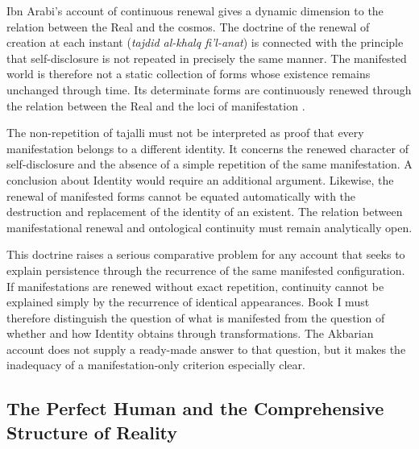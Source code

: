 \label{para:VS.B01.P01.C08.S16.SS12.P001}

Ibn Arabi's account of continuous renewal gives
a dynamic dimension to the relation between the
Real and the cosmos. The doctrine of the renewal
of creation at each instant
(\textit{tajdid al-khalq fi'l-anat}) is connected
with the principle that self-disclosure is not
repeated in precisely the same manner. The
manifested world is therefore not a static
collection of forms whose existence remains
unchanged through time. Its determinate forms
are continuously renewed through the relation
between the Real and the loci of manifestation
\citep{ChittickSelfDisclosureGod1998}.

\label{para:VS.B01.P01.C08.SS12.P002}

The non-repetition of tajalli must not be interpreted
as proof that every manifestation belongs to a
different identity. It concerns the renewed
character of self-disclosure and the absence of
a simple repetition of the same manifestation.
A conclusion about Identity would require an
additional argument. Likewise, the renewal of
manifested forms cannot be equated automatically
with the destruction and replacement of the
identity of an existent. The relation between
manifestational renewal and ontological continuity
must remain analytically open.

\label{para:VS.B01.P01.C08.SS12.P003}

This doctrine raises a serious comparative problem
for any account that seeks to explain persistence
through the recurrence of the same manifested
configuration. If manifestations are renewed
without exact repetition, continuity cannot be
explained simply by the recurrence of identical
appearances. Book I must therefore distinguish
the question of what is manifested from the
question of whether and how Identity obtains
through transformations. The Akbarian account
does not supply a ready-made answer to that
question, but it makes the inadequacy of a
manifestation-only criterion especially clear.



\subsection{The Perfect Human and the Comprehensive Structure of Reality}
\label{subsec:ch08_s16_ss13}

